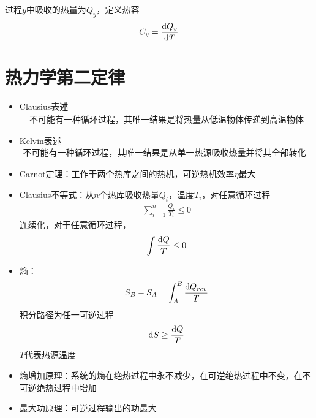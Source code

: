 过程$y$中吸收的热量为$Q_y$，定义热容
\begin{gather*}
    C_y = \frac{\mathrm{d} Q_y}{\mathrm{d} T}
\end{gather*}

\section{热力学第二定律}

\begin{itemize}
    \item Clausius表述
    \begin{gather*}
        \text{不可能有一种循环过程，其唯一结果是将热量从低温物体传递到高温物体}
    \end{gather*}
    \item Kelvin表述
    \begin{gather*}
        \text{不可能有一种循环过程，其唯一结果是从单一热源吸收热量并将其全部转化为功}
    \end{gather*}
\end{itemize}

\begin{itemize}
    \item Carnot定理：工作于两个热库之间的热机，可逆热机效率$\eta$最大
    \item Clausius不等式：从$n$个热库吸收热量$Q_i$，温度$T_i$，对任意循环过程
    \begin{gather*}
        \sum_{i=1}^{n} \frac{Q_i}{T_i} \leq 0
    \end{gather*}
    连续化，对于任意循环过程，
    \begin{gather*}
        \int \frac{\mathrm{d} Q}{T} \leq 0
    \end{gather*}
    \item 熵：
    \begin{gather*}
        S_B - S_A = \int_A^B \frac{\mathrm{d} Q_{rev}}{T}
    \end{gather*}
    积分路径为任一可逆过程
    \begin{gather*}
        \mathrm{d} S \geq \frac{\mathrm{d} Q}{T}
    \end{gather*}
    $T$代表热源温度
    \item 熵增加原理：系统的熵在绝热过程中永不减少，在可逆绝热过程中不变，在不可逆绝热过程中增加
    \item 最大功原理：可逆过程输出的功最大
\end{itemize}